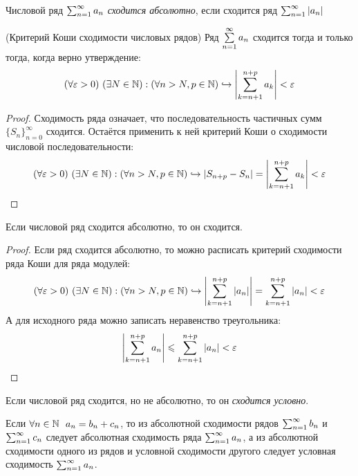 
\begin{definition}
	Числовой ряд $\sum_{n = 1}^\infty a_n$ \textit{сходится абсолютно}, если сходится ряд $\sum_{n = 1}^\infty |a_n|$
\end{definition}

\begin{theorem} (Критерий Коши сходимости числовых рядов)
	Ряд $\sum\limits_{n = 1}^\infty a_n$ сходится тогда и только тогда, когда верно утверждение:
	\[
		(\forall \varepsilon > 0)\ (\exists N \in \mathbb{N}) : (\forall n > N, p \in \mathbb{N}) \hookrightarrow \left|\sum\limits_{k = n + 1}^{n + p} a_k\right| < \varepsilon
	\]
\end{theorem}

\begin{proof}
	Сходимость ряда означает, что последовательность частичных сумм $\{S_n\}_{n = 0}^\infty$ сходится. Остаётся применить к ней критерий Коши о сходимости числовой последовательности:
	\[
		(\forall \eps > 0)\ (\exists N \in \N) : (\forall n > N, p \in \N) \emb |S_{n + p} - S_n| = \left|\suml_{k = n + 1}^{n + p} a_k\right| < \eps
	\]
\end{proof}

\begin{theorem}
	Если числовой ряд сходится абсолютно, то он сходится.
\end{theorem}

\begin{proof}
	Если ряд сходится абсолютно, то можно расписать критерий сходимости ряда Коши для ряда модулей:
	\[
		(\forall \varepsilon > 0)\ (\exists N \in \mathbb{N}) : (\forall n > N, p \in \mathbb{N}) \hookrightarrow \left|\sum\limits_{k = n + 1}^{n + p} |a_n|\right| = \sum\limits_{k = n + 1}^{n + p} |a_n| < \varepsilon
	\]
	А для исходного ряда можно записать неравенство треугольника:
	\[
		\left|\sum\limits_{k = n + 1}^{n + p} a_n\right| \leqslant \sum\limits_{k = n + 1}^{n + p} |a_n| < \varepsilon
	\]
\end{proof}

\begin{definition}
	Если числовой ряд сходится, но не абсолютно, то он \textit{сходится условно}.
\end{definition}

\begin{theorem}
	Если $\forall n \in \mathbb{N}\ \ a_n = b_n + c_n$, то из абсолютной сходимости рядов $\sum_{n = 1}^\infty b_n$ и $\sum_{n = 1}^\infty c_n$ следует абсолютная сходимость ряда $\sum_{n = 1}^\infty a_n$, а из абсолютной сходимости одного из рядов и условной сходимости другого следует условная сходимость $\sum_{n = 1}^\infty a_n$.
\end{theorem}

